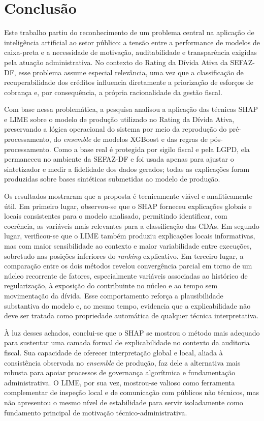 \chapter{Conclusão}
\label{cap:conclusao}

Este trabalho partiu do reconhecimento de um problema central na aplicação de inteligência artificial ao setor público: a tensão entre a performance de modelos de caixa-preta e a necessidade de motivação, auditabilidade e transparência exigidas pela atuação administrativa. No contexto do Rating da Dívida Ativa da SEFAZ-DF, esse problema assume especial relevância, uma vez que a classificação de recuperabilidade dos créditos influencia diretamente a priorização de esforços de cobrança e, por consequência, a própria racionalidade da gestão fiscal.

Com base nessa problemática, a pesquisa analisou a aplicação das técnicas SHAP e LIME sobre o modelo de produção utilizado no Rating da Dívida Ativa, preservando a lógica operacional do sistema por meio da reprodução do pré-processamento, do \textit{ensemble} de modelos XGBoost e das regras de pós-processamento. Como a base real é protegida por sigilo fiscal e pela LGPD, ela permaneceu no ambiente da SEFAZ-DF e foi usada apenas para ajustar o sintetizador e medir a fidelidade dos dados gerados; todas as explicações foram produzidas sobre bases sintéticas submetidas ao modelo de produção.

Os resultados mostraram que a proposta é tecnicamente viável e analiticamente útil. Em primeiro lugar, observou-se que o SHAP forneceu explicações globais e locais consistentes para o modelo analisado, permitindo identificar, com coerência, as variáveis mais relevantes para a classificação das CDAs. Em segundo lugar, verificou-se que o LIME também produziu explicações locais informativas, mas com maior sensibilidade ao contexto e maior variabilidade entre execuções, sobretudo nas posições inferiores do \textit{ranking} explicativo. Em terceiro lugar, a comparação entre os dois métodos revelou convergência parcial em torno de um núcleo recorrente de fatores, especialmente variáveis associadas ao histórico de regularização, à exposição do contribuinte no núcleo e ao tempo sem movimentação da dívida. Esse comportamento reforça a plausibilidade substantiva do modelo e, ao mesmo tempo, evidencia que a explicabilidade não deve ser tratada como propriedade automática de qualquer técnica interpretativa.

À luz desses achados, conclui-se que o SHAP se mostrou o método mais adequado para sustentar uma camada formal de explicabilidade no contexto da auditoria fiscal. Sua capacidade de oferecer interpretação global e local, aliada à consistência observada no \textit{ensemble} de produção, faz dele a alternativa mais robusta para apoiar processos de governança algorítmica e fundamentação administrativa. O LIME, por sua vez, mostrou-se valioso como ferramenta complementar de inspeção local e de comunicação com públicos não técnicos, mas não apresentou o mesmo nível de estabilidade para servir isoladamente como fundamento principal de motivação técnico-administrativa.

